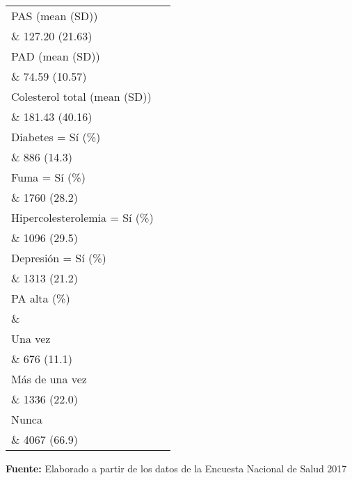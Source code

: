 \documentclass{aa}
\begin{document}
\begin{table}{}
\begin{tabular*}{.9\linewidth}{@{\extracolsep{\fill}}ll}
PAS (mean (SD)) \\\& 127.20 (21.63)\\
PAD (mean (SD)) \\\& 74.59 (10.57)\\
Colesterol total (mean (SD)) \\\& 181.43 (40.16)\\
Diabetes = Sí (\%) \\\& 886 (14.3)\\
Fuma = Sí (\%) \\\& 1760 (28.2)\\
Hipercolesterolemia = Sí (\%)\\\&   1096 (29.5)\\
Depresión = Sí (\%) \\\& 1313 (21.2)\\
\addlinespace
PA alta (\%) \\\& \\
\-\hspace{5mm} \tiny Una vez \\\& 676 (11.1)\\
\-\hspace{5mm} \tiny Más de una vez \\\& 1336 (22.0)\\
\-\hspace{5mm} \tiny Nunca \\\& 4067 (66.9)\\
\bottomrule
\end{tabular*}
    \vspace{1ex}
    
    {\raggedright \small \textbf{Fuente:} Elaborado a partir de los datos de la Encuesta Nacional de Salud 2017 \par}
\end{table}
\end{document}
